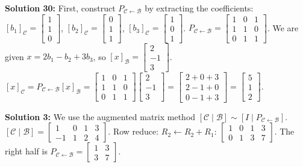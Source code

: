 \documentclass[11pt]{article}
\begin{document}
\vspace{0.5cm}
\textbf{Solution 30:} First, construct $P_{\mathcal{C} \leftarrow \mathcal{B}}$ by extracting the coefficients:
$[b_1]_{\mathcal{C}} = \begin{bmatrix} 1 \\ 1 \\ 0 \end{bmatrix}$, $[b_2]_{\mathcal{C}} = \begin{bmatrix} 0 \\ 1 \\ 1 \end{bmatrix}$, $[b_3]_{\mathcal{C}} = \begin{bmatrix} 1 \\ 0 \\ 1 \end{bmatrix}$.
$P_{\mathcal{C} \leftarrow \mathcal{B}} = \begin{bmatrix} 1 & 0 & 1 \\ 1 & 1 & 0 \\ 0 & 1 & 1 \end{bmatrix}$.
We are given $x = 2b_1 - b_2 + 3b_3$, so $[x]_{\mathcal{B}} = \begin{bmatrix} 2 \\ -1 \\ 3 \end{bmatrix}$.
$[x]_{\mathcal{C}} = P_{\mathcal{C} \leftarrow \mathcal{B}}[x]_{\mathcal{B}} = \begin{bmatrix} 1 & 0 & 1 \\ 1 & 1 & 0 \\ 0 & 1 & 1 \end{bmatrix} \begin{bmatrix} 2 \\ -1 \\ 3 \end{bmatrix} = \begin{bmatrix} 2 + 0 + 3 \\ 2 - 1 + 0 \\ 0 - 1 + 3 \end{bmatrix} = \begin{bmatrix} 5 \\ 1 \\ 2 \end{bmatrix}$.

\vspace{0.5cm}
\textbf{Solution 3:} We use the augmented matrix method $[\mathcal{C} \mid \mathcal{B}] \sim [I \mid P_{\mathcal{C} \leftarrow \mathcal{B}}]$.
$[\mathcal{C} \mid \mathcal{B}] = \begin{bmatrix} 1 & 0 & 1 & 3 \\ -1 & 1 & 2 & 4 \end{bmatrix}$.
Row reduce: $R_2 \leftarrow R_2 + R_1$:
$\begin{bmatrix} 1 & 0 & 1 & 3 \\ 0 & 1 & 3 & 7 \end{bmatrix}$.
The right half is $P_{\mathcal{C} \leftarrow \mathcal{B}} = \begin{bmatrix} 1 & 3 \\ 3 & 7 \end{bmatrix}$.
\end{document}
